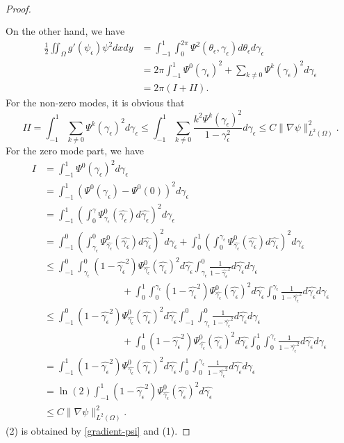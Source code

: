 \documentclass[1 [leqno, 11pt]{amsart}
\numberwithin{equation}{section}
\let\ep=\epsilon
\begin{document}
\begin{CJK*}{GBK}{song}
\begin{proof}
\begin{align}
\begin{split}
\end{split}
\end{align}
On the other hand, we have
\begin{align*}
\frac{1}{2}\iint_\Omega g'(\psi_\epsilon)\psi^2 dxdy
& =  \int_{-1}^1 \int_0 ^{2\pi} \Psi^2(\theta_\ep, \gamma_\ep) d\theta_\ep d\gamma_\ep \\
& = 2 \pi \int_{-1}^1  \Psi^0(\gamma_\ep)^2 + \sum_{k \neq 0}  \Psi^k(\gamma_\ep)^2d\gamma_\ep \\
& = 2\pi (I + II).
\end{align*}
For the non-zero modes, it is obvious that
$$II = \int_{-1}^1 \sum_{k \neq 0}  \Psi^k(\gamma_\ep)^2 d\gamma_\ep
\leq \int_{-1}^1 \sum_{k \neq 0} \frac{k^2 \Psi^k(\gamma_\ep)^2}{1-\gamma_\ep^2} d\gamma_\ep
\leq C \|\nabla \psi\|_{L^2(\Omega)}^2.$$
For the zero mode part, we have
\begin{align*}
I & = \int_{-1}^1  \Psi^0(\gamma_\ep)^2 d\gamma_\ep \\
& = \int_{-1}^1 \left( \Psi^0(\gamma_\ep) - \Psi^0(0)\right)^2 d\gamma_\ep \\
& = \int_{-1}^1 \left(\int_0^\gamma \Psi^0_{\hat{\gamma_\ep}}(\hat{\gamma_\ep}) d\hat{\gamma_\ep} \right)^2 d\gamma_\ep \\
& = \int_{-1}^0 \left(\int_{\gamma_\ep}^0 \Psi^0_{\hat{\gamma_\ep}}(\hat{\gamma_\ep}) d\hat{\gamma_\ep} \right)^2 d\gamma_\ep +  \int_{0}^1 \left(\int_0^{\gamma_\ep} \Psi^0_{\hat{\gamma_\ep}}(\hat{\gamma_\ep}) d\hat{\gamma_\ep} \right)^2 d\gamma_\ep \\
& \leq \int_{-1}^0 \int_{\gamma_\ep}^0 (1-\hat{\gamma_\ep}^2) \Psi^0_{\hat{\gamma_\ep}}(\hat{\gamma_\ep})^2 d\hat{\gamma_\ep} \int_{\gamma_\ep}^0 \frac{1}{1-\hat{\gamma_\ep}^2}d\hat{\gamma_\ep} d \gamma_\ep \\
& \qquad \qquad \qquad \qquad +  \int_{0}^1 \int_0^{\gamma_\ep} (1-\hat{\gamma_\ep}^2) \Psi^0_{\hat{\gamma_\ep}}(\hat{\gamma_\ep})^2 d\hat{\gamma_\ep} \int_0^{\gamma_\ep} \frac{1}{1-\hat{\gamma_\ep}^2}d\hat{\gamma_\ep} d \gamma_\ep \\
& \leq \int_{-1}^0 (1-\hat{\gamma_\ep}^2) \Psi^0_{\hat{\gamma_\ep}}(\hat{\gamma_\ep})^2 d\hat{\gamma_\ep} \int_{-1}^0  \int_{\gamma_\ep}^0 \frac{1}{1-\hat{\gamma_\ep}^2}d\hat{\gamma_\ep} d \gamma_\ep \\
& \qquad \qquad \qquad \qquad +   \int_0^{1} (1-\hat{\gamma_\ep}^2) \Psi^0_{\hat{\gamma_\ep}}(\hat{\gamma_\ep})^2 d\hat{\gamma_\ep} \int_{0}^1 \int_0^{\gamma_\ep} \frac{1}{1-\hat{\gamma_\ep}^2}d\hat{\gamma_\ep} d \gamma_\ep  \\
& = \int_{-1}^{1} (1-\hat{\gamma_\ep}^2) \Psi^0_{\hat{\gamma_\ep}}(\hat{\gamma_\ep})^2 d\hat{\gamma_\ep} \int_{0}^1 \int_0^{\gamma_\ep} \frac{1}{1-\hat{\gamma_\ep}^2}d\hat{\gamma_\ep} d \gamma_\ep  \\
&= \ln(2) \int_{-1}^{1} (1-\hat{\gamma_\ep}^2) \Psi^0_{\hat{\gamma_\ep}}(\hat{\gamma_\ep})^2 d\hat{\gamma_\ep} \\
& \leq C \|\nabla \psi\|_{L^2(\Omega)}^2.
\end{align*}
(2) is obtained by \eqref{gradient-psi} and (1).\end{proof}
\fi


\end{CJK*}
\end{document}
